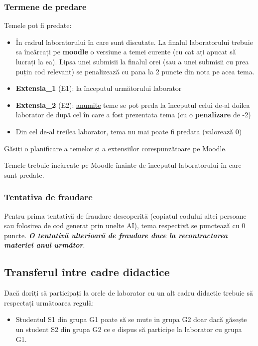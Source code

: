 \documentclass[../en-fa-lab.tex]{subfiles}
\begin{document}
\subsubsection{Termene de predare}\label{termene-de-predare}

Temele pot fi predate:

\begin{itemize}
\item
  În cadrul laboratorului în care sunt discutate. La finalul laboratorului trebuie sa încărcați pe \textbf{moodle} o versiune a temei curente (cu cat ați apucat să lucrați la ea). Lipsa unei submisii la finalul orei (sau a unei submisii cu prea puțin cod relevant) se penalizează cu pana la 2 puncte din nota pe acea tema.
\item
  \textbf{Extensia\_1} (E1): la începutul următorului laborator
\item
  \textbf{Extensia\_2} (E2): \ul{anumite} teme se pot preda la începutul
  celui de-al doilea laborator de după cel în care a fost prezentata
  tema (cu o \textbf{penalizare} de -2)
\item
  Din cel de-al treilea laborator, tema nu mai poate fi predata
  (valorează 0)
\end{itemize}

Găsiți o planificare a temelor și a extensiilor corespunzătoare pe
Moodle.

Temele trebuie încărcate pe Moodle înainte de începutul laboratorului în care sunt predate.

\subsubsection{Tentativa de fraudare}\label{tentativa-de-fraudare}

Pentru prima tentativă de fraudare descoperită (copiatul codului altei persoane sau folosirea de cod generat prin unelte AI), tema respectivă se punctează cu 0 puncte. \emph{\textbf{O tentativă ulterioară de fraudare duce la recontractarea materiei anul următor}}.

\subsection{Transferul între cadre
didactice}\label{transferul-uxeentre-cadre-didactice}

Dacă doriți să participați la orele de laborator cu un alt cadru
didactic trebuie să respectați următoarea regulă:

\begin{itemize}
\item
  Studentul S1 din grupa G1 poate să se mute in grupa G2 doar dacă găsește un student S2 din grupa G2 ce e dispus să participe la laborator cu grupa G1.
\end{itemize}
\end{document}
